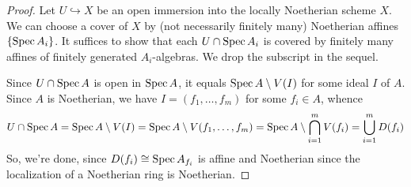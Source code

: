\begin{proof}
	Let $U \hookrightarrow X$ be an open immersion into the locally Noetherian scheme $X$. We can choose a cover of $X$ by (not necessarily finitely many) Noetherian affines $\{\operatorname{Spec} A_i\}$. It suffices to show that each $U \cap \operatorname{Spec} A_i$ is covered by finitely many affines of finitely generated $A_i$-algebras. We drop the subscript in the sequel.
	
	Since $U \cap \operatorname{Spec} A$ is open in $\operatorname{Spec} A$, it equals $\operatorname{Spec} A \setminus V(I)$ for some ideal $I$ of $A$. Since $A$ is Noetherian, we have $I = (f_1,\ldots,f_m)$ for some $f_i \in A$, whence
	\[ U \cap \operatorname{Spec} A = \operatorname{Spec} A \setminus V(I) = \operatorname{Spec} A \setminus V(f_1,\ldots,f_m) = \operatorname{Spec} A \setminus \bigcap_{i=1}^m V(f_i) = \bigcup_{i=1}^m D(f_i) \]
	So, we're done, since $D(f_i) \cong \operatorname{Spec} A_{f_i}$ is affine and Noetherian since the localization of a Noetherian ring is Noetherian.
\end{proof}
